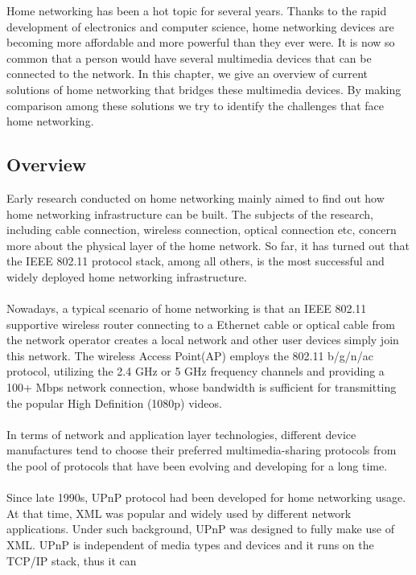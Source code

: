 
Home networking has been a hot topic for several years. Thanks to the rapid development 
of electronics and computer science, home networking devices are becoming more affordable 
and more powerful than they ever were. It is now so common that a person would
have several multimedia devices that can be connected to the network. In this
chapter, we give an overview of current solutions of home networking that
bridges these multimedia devices. By making comparison among these solutions we
try to identify the challenges that face home networking.
\subsection{Overview} 
Early research \cite{link_layer_old} \cite{end_user} \cite{link_layer}
conducted on home networking mainly aimed to find out how home networking
infrastructure can be built. The subjects of the research, including cable
connection, wireless connection, optical connection etc, concern more about
the physical layer of the home network.  So far, it has turned out that the
IEEE 802.11 protocol stack, among all others, is the most successful and 
widely deployed home networking infrastructure.\\
\\
Nowadays, a typical scenario of home networking is that an IEEE 802.11
supportive wireless router connecting to a Ethernet cable or optical cable from
the network operator creates a local network and other user devices simply join
this network. The wireless Access Point(AP) employs the 802.11 b/g/n/ac
protocol, utilizing the 2.4 GHz or 5 GHz frequency channels and providing a
100+ Mbps  network connection, whose bandwidth is sufficient for transmitting
the popular High Definition (1080p) videos.\\
\\
In terms of network and application layer technologies, different device 
manufactures tend to choose their preferred multimedia-sharing protocols from
the pool of protocols that have been evolving and developing for a long time.\\
\\
Since late 1990s, UPnP protocol had been developed for home networking usage. 
At that time, XML was popular and widely used by different network applications.
Under such background, UPnP was designed to fully make use of XML. UPnP is 
independent of media types and devices and it runs on the TCP/IP stack, thus it can 

